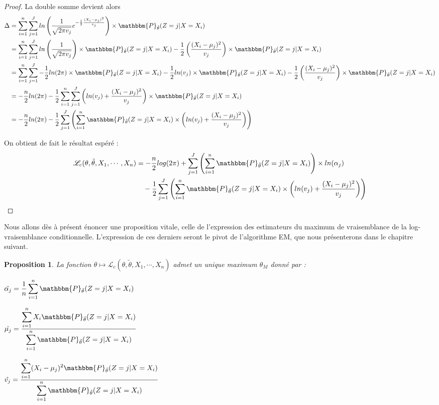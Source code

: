 \documentclass[frenchb]{report}
\newcommand{\1}{\mathbbm{1}}
\newcommand{\prob}{\mathbbm{P}}
\newcommand{\lv}{\mathcal{L}}
\newcommand{\thetat}{\tilde{\theta}}
\newtheorem{prop}{Proposition}
\theoremstyle{definition}\newtheorem{defn}{Définition}
\theoremstyle{definition}\newtheorem{exm}{Exemple}
\theoremstyle{definition}\newtheorem{nota}{Notation}
\theoremstyle{definition}\newtheorem{rem}{Remarque}
\begin{document}
\begin{proof}
La double somme devient alors 
\begin{align*}
\Delta &= \sum_{i=1}^n \sum_{j = 1}^J ln\left(\frac{1}{\sqrt{2 \pi v_j}}e^{-\frac{1}{2}\frac{(X_i - \mu_j)^2}{v_j}}\right)\times\prob_{\thetat} (Z = j|X = X_i) \\
&=\sum_{i=1}^n \sum_{j = 1}^J ln\left(\frac{1}{\sqrt{2 \pi v_j}}\right)\times\prob_{\thetat} (Z = j|X = X_i) -\frac{1}{2}\left(\frac{(X_i - \mu_j)^2}{v_j}\right)\times\prob_{\thetat} (Z = j|X = X_i)\\
&=\sum_{i=1}^n \sum_{j = 1}^J -\frac{1}{2} ln(2\pi)\times \prob_{\thetat} (Z = j|X = X_i)-\frac{1}{2}ln(v_j)\times \prob_{\thetat} (Z = j|X = X_i) -\frac{1}{2}\left(\frac{(X_i - \mu_j)^2}{v_j}\right)\times\prob_{\thetat} (Z = j|X = X_i) \\
&=-\frac{n}{2}ln(2\pi)  -\frac{1}{2} \sum_{i=1}^n \sum_{j = 1}^J \left(ln(v_j) + \frac{(X_i - \mu_j)^2}{v_j}\right)\times\prob_{\thetat} (Z = j|X = X_i) \\
&=-\frac{n}{2}ln(2\pi)  -\frac{1}{2} \sum_{j=1}^J \left( \sum_{i = 1}^n \prob_{\thetat} (Z = j|X = X_i)\times \left(ln(v_j) + \frac{(X_i - \mu_j)^2}{v_j}\right)\right) \\
\end{align*}

On obtient de fait le résultat espéré :
\begin{align*}
 \lv_{c}(\theta, \thetat, X_1, \cdots, X_n) &= -\frac{n}{2}log(2\pi)+\sum_{j=1}^J \left(\sum_{i = 1}^n  \prob_{\thetat}(Z=j|X=X_i)\right) \times ln(\alpha_j)\\
&~~~-\frac{1}{2}\sum_{j=1}^J\left(\sum_{i=1}^n \prob_{\thetat}(Z=j|X=X_i)\times\left(ln(v_j)+\frac{(X_i-\mu_j)^2}{v_j}\right)\right)
\end{align*}
\end{proof}

Nous allons dès à présent énoncer une proposition vitale, celle de l'expression des estimateurs du maximum de vraisemblance de la log-vraisemblance conditionnelle. L'expression de ces derniers seront le pivot de l'algorithme EM, que nous présenterons dans le chapitre suivant.

\begin{prop}La fonction $\theta \mapsto \lv_{c}(\theta,\thetat, X_1, \cdots, X_n)$ admet un unique maximum $\theta_M$ donné par : 
\begin{center}
$\hat{\alpha_j} = \displaystyle\frac{1}{n}\sum_{i=1}^n \prob_{\thetat}(Z=j|X=X_i)$
\end{center}
\begin{center}

$\hat{\mu_j}= \displaystyle\frac{\displaystyle\sum_{i=1}^n X_i\prob_{\thetat}(Z=j|X=X_i)}{\displaystyle\sum_{i=1}^n \prob_{\thetat}(Z=j|X=X_i)}$
\end{center}
\begin{center}

$\hat{v_j} = \displaystyle\frac{\displaystyle\sum_{i=1}^n (X_i -\mu_j)^2 \prob_{\thetat}(Z=j|X=X_i)}{\displaystyle\sum_{i=1}^n\prob_{\thetat}(Z=j|X=X_i)}$
\end{center}
\end{prop}
\end{document}
